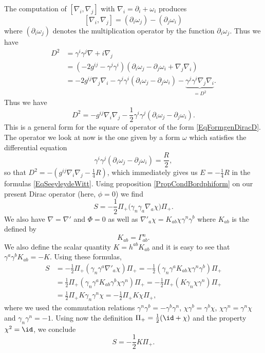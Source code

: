 The computation of $[\nabla_i,\nabla_j]$ with $\nabla_i=\partial_i+\omega_i$ produces
\[ 
  [\nabla_i,\nabla_j]=(\partial_i\omega_j)-(\partial_j\omega_i)
\]
where $(\partial_i\omega_j)$ denotes the multiplication operator by the function $\partial_i\omega_j$. Thus we have
\begin{equation}
\begin{split}
D^2	&=\gamma^i\gamma^j\nabla+i\nabla_j\\	
	&=(-2g^{ij}-\gamma^j\gamma^i)(\partial_i\omega_j-\partial_j\omega_i+\nabla_j\nabla_i)\\
	&=-2g^{ij}\nabla_j\nabla_i-\gamma^j\gamma^i(\partial_i\omega_j-\partial_j\omega_i)-\underbrace{\gamma^j\gamma^i\nabla_j\nabla_i}_{=D^2}.
\end{split}
\end{equation}
Thus we have
\begin{equation}
D^2=-g^{ij}\nabla_i\nabla_j-\frac{ 1 }{2}\gamma^i\gamma^j(\partial_i\omega_j-\partial_j\omega_i).
\end{equation}
This is a general form for the square of operator of the form \eqref{EqFormgenDiracD}. The operator we look at now is the one given by a form $\omega$ which satisfies the differential equation
\begin{equation}
\gamma^i\gamma^j(\partial_i\omega_j-\partial_j\omega_i)=\frac{ R }{ 2 },
\end{equation}
so that $D^2=-(g^{ij}\nabla_i\nabla_j-\frac{1}{ 4 }R)$, which immediately gives us $E=-\frac{1}{ 4 }R$ in the formulas \eqref{EqSeeyleydeWitt}. Using proposition \ref{PropCondBordphiform} on our present Dirac operator (here, $\phi=0$) we find
\begin{equation}
	S=-\frac{1}{ 2 }\Pi_+\big(\gamma_n\gamma_a\nabla_a\chi \big)\Pi_+.
\end{equation}
We also have $\nabla=\nabla'$ and $\Phi=0$ as well as $\nabla'_a\chi=K_{ab}\chi\gamma^n\gamma^b$ where $K_{ab}$ is the  defined by 
\[ 
  K_{ab}=\Gamma^n_{ab}.
\]
We also define the scalar quantity $K=h^{ab}K_{ab}$ and it is easy to see that $\gamma^a\gamma^bK_{ab}=-K$. Using these formulas,
\[ 
\begin{split}
S	&=-\frac{ 1 }{2}\Pi_+(\gamma_n\gamma^a\nabla'_a\chi)\Pi_+
	=-\frac{ 1 }{2}(\gamma_n\gamma^aK_{ab}\chi\gamma^n\gamma^b)\Pi_+\\
	&=\frac{ 1 }{2}\Pi_+(\gamma_n\gamma^a K_{ab}\gamma^b\chi\gamma^n)\Pi_+
	=-\frac{ 1 }{2}\Pi_+(K\gamma_n\chi\gamma^n)\Pi_+\\
	&=\frac{ 1 }{2}\Pi_+K\gamma_n\gamma^n\chi
	=-\frac{ 1 }{2}\Pi_+K\chi\Pi_+,
\end{split}  
\]
where we used the commutation relations $\gamma^n\gamma^b=-\gamma^b\gamma^n$, $\chi\gamma^b=\gamma^b\chi$, $\chi\gamma^n=\gamma^n\chi$ and $\gamma_n\gamma^n=-1$. Using now the definition $\Pi_+=\frac{1}{2}(\id+\chi)$ and the property $\chi^2=\id$, we conclude
\begin{equation}
S	=	-\frac{ 1 }{2}K\Pi_+.
\end{equation}


